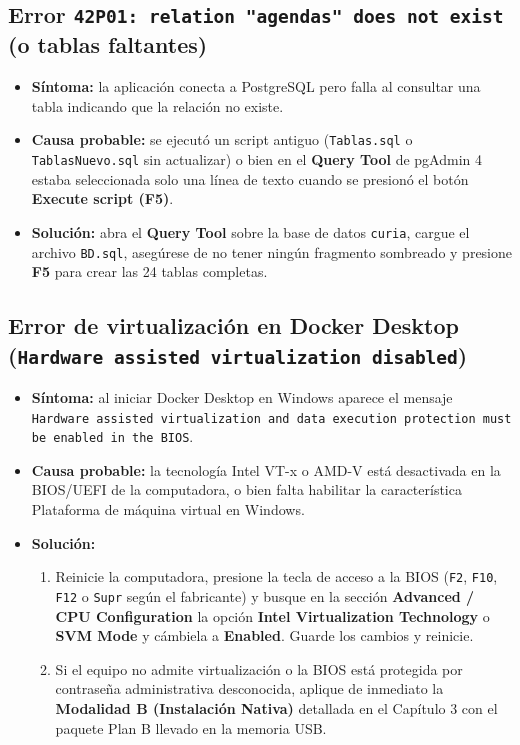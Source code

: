 \subsection{Error \texttt{42P01: relation "agendas" does not exist} (o tablas faltantes)}
\begin{itemize}
    \item \textbf{Síntoma:} la aplicación conecta a PostgreSQL pero falla al consultar una tabla indicando que la relación no existe.
    \item \textbf{Causa probable:} se ejecutó un script antiguo (\texttt{Tablas.sql} o \texttt{TablasNuevo.sql} sin actualizar) o bien en el \textbf{Query Tool} de pgAdmin 4 estaba seleccionada solo una línea de texto cuando se presionó el botón \textbf{Execute script (F5)}.
    \item \textbf{Solución:} abra el \textbf{Query Tool} sobre la base de datos \texttt{curia}, cargue el archivo \texttt{BD.sql}, asegúrese de no tener ningún fragmento sombreado y presione \textbf{F5} para crear las 24 tablas completas.
\end{itemize}

\subsection{Error de virtualización en Docker Desktop (\texttt{Hardware assisted virtualization disabled})}
\begin{itemize}
    \item \textbf{Síntoma:} al iniciar Docker Desktop en Windows aparece el mensaje \texttt{Hardware assisted virtualization and data execution protection must be enabled in the BIOS}.
    \item \textbf{Causa probable:} la tecnología Intel VT-x o AMD-V está desactivada en la BIOS/UEFI de la computadora, o bien falta habilitar la característica Plataforma de máquina virtual en Windows.
    \item \textbf{Solución:}
    \begin{enumerate}
        \item Reinicie la computadora, presione la tecla de acceso a la BIOS (\texttt{F2}, \texttt{F10}, \texttt{F12} o \texttt{Supr} según el fabricante) y busque en la sección \textbf{Advanced / CPU Configuration} la opción \textbf{Intel Virtualization Technology} o \textbf{SVM Mode} y cámbiela a \textbf{Enabled}. Guarde los cambios y reinicie.
        \item Si el equipo no admite virtualización o la BIOS está protegida por contraseña administrativa desconocida, aplique de inmediato la \textbf{Modalidad B (Instalación Nativa)} detallada en el Capítulo 3 con el paquete Plan B llevado en la memoria USB.
    \end{enumerate}
\end{itemize}

